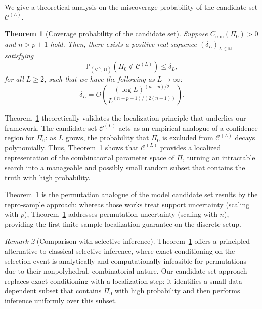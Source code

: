 \documentclass[11pt, reqno]{amsart}
\newcommand{\N}{\mathbb{N}}
\newcommand{\bP}{\mathbb{P}}
\renewcommand{\le}{\leqslant}
\renewcommand{\ge}{\geqslant}
\newcommand{\1}{\mbox{1}\hspace{-0.25em}\mbox{l}}
\theoremstyle{definition}\newtheorem{problem}{Problem}[section]
\theoremstyle{definition}\newtheorem{definition}[problem]{Definition}
\theoremstyle{remark}\newtheorem{assumption}{Assumption}
\theoremstyle{remark}\newtheorem{remark}[problem]{Remark}
\theoremstyle{definition}\newtheorem{example}[problem]{Example}
\theoremstyle{plain}\newtheorem{theorem}[problem]{Theorem}
\theoremstyle{plain}\newtheorem{question}[problem]{Question}
\theoremstyle{plain}\newtheorem{lemma}[problem]{Lemma}
\theoremstyle{plain}\newtheorem{proposition}[problem]{Proposition}
\theoremstyle{plain}\newtheorem{corollary}[problem]{Corollary}
\theoremstyle{plain}\newtheorem{conjecture}[problem]{Conjecture}
\begin{document}
We give a theoretical analysis on the miscoverage probability of the candidate set $\mathcal{C}^{(L)}$.




\begin{theorem}[Coverage probability of the candidate set]\label{thm:recovery}
Suppose $C_{\min}(\Pi_0) > 0$ and $n > p + 1$ hold. Then, there exists a positive real sequence $(\delta_L)_{L \in \N}$ satisfying
\begin{equation}
\label{eq:recovery-finite-L}
\bP_{\left(\mathcal{U}^L, \bm{U}\right)}\left( \Pi_0 \notin \mathcal{C}^{(L)} \right) \le
\delta_L,
\end{equation}
for all $L \ge 2$, such that we have the following as $L \to \infty$:
\begin{equation}\label{eq:delta_L}
     \delta_L
= O\left( \frac{\left(\log L\right)^{(n-p)/2}}{L^{(n-p-1)/(2(n-1))}} \right).   
\end{equation}

\end{theorem}






Theorem~\ref{thm:recovery} theoretically validates the localization principle that underlies our framework.  
The candidate set $\mathcal{C}^{(L)}$ acts as an empirical analogue of a confidence region for $\Pi_0$: as $L$ grows, the probability that $\Pi_0$ is excluded from $\mathcal{C}^{(L)}$ decays polynomially.  
Thus, Theorem~\ref{thm:recovery} shows that $\mathcal{C}^{(L)}$ provides a localized representation of the combinatorial parameter space of $\Pi$, turning an intractable search into a manageable and possibly small random subset that contains the truth with high probability.


Theorem~\ref{thm:recovery} is the permutation analogue of the model candidate set results  \citep{wang2022finite,hou2025repro} by the repro-sample approach: whereas those works treat support uncertainty (scaling with $p$), Theorem~\ref{thm:recovery} addresses permutation uncertainty (scaling with $n$), providing the first finite-sample localization guarantee on the discrete setup. 


\begin{remark}[Comparison with selective inference]
    Theorem~\ref{thm:recovery} offers a principled alternative to classical selective inference, where exact conditioning on the selection event is analytically and computationally infeasible for permutations due to their nonpolyhedral, combinatorial nature.  
Our candidate-set approach replaces exact conditioning with a localization step: it identifies a small data-dependent subset that contains $\Pi_0$ with high probability and then performs inference uniformly over this subset.  
\end{remark}
\end{document}
